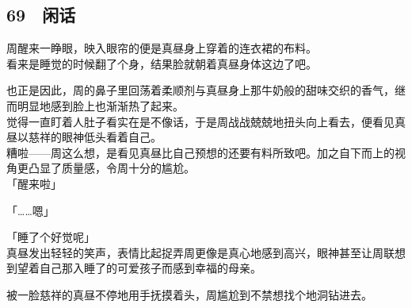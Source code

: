 \subsection{69　闲话}

周醒来一睁眼，映入眼帘的便是真昼身上穿着的连衣裙的布料。\\

看来是睡觉的时候翻了个身，结果脸就朝着真昼身体这边了吧。

也正是因此，周的鼻子里回荡着柔顺剂与真昼身上那牛奶般的甜味交织的香气，继而明显地感到脸上也渐渐热了起来。\\

觉得一直盯着人肚子看实在是不像话，于是周战战兢兢地扭头向上看去，便看见真昼以慈祥的眼神低头看着自己。\\

糟啦——周这么想，是看见真昼比自己预想的还要有料所致吧。加之自下而上的视角更凸显了质量感，令周十分的尴尬。\\

「醒来啦」

「……嗯」

「睡了个好觉呢」\\

真昼发出轻轻的笑声，表情比起捉弄周更像是真心地感到高兴，眼神甚至让周联想到望着自己那入睡了的可爱孩子而感到幸福的母亲。

被一脸慈祥的真昼不停地用手抚摸着头，周尴尬到不禁想找个地洞钻进去。

